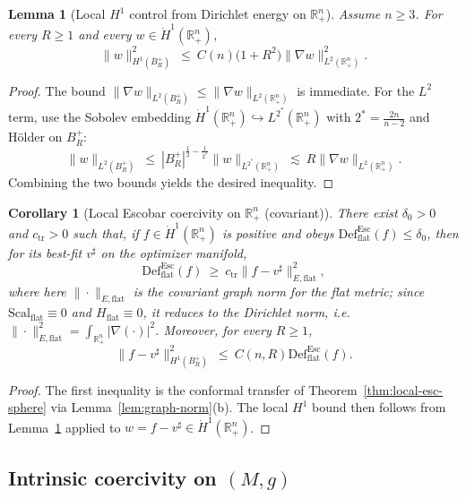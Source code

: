 \documentclass[11pt,reqno,a4paper]{amsart}
\newcommand{\R}{\mathbb{R}}
\numberwithin{equation}{section}
\newcommand{\Def}{\mathrm{Def}}
\theoremstyle{plain}
\newtheorem{lemma}[theorem]{Lemma}
\newtheorem{corollary}[theorem]{Corollary}
\newcommand{\Scal}{\mathrm{Scal}}
\theoremstyle{remark}
\theoremstyle{plain}
\begin{document}
\begin{lemma}[Local $H^1$ control from Dirichlet energy on $\R^n_+$]\label{lem:local-H1-from-Dirichlet}
Assume $n\ge3$. For every $R\ge1$ and every $w\in \dot H^1(\R^n_+)$,
\[
\|w\|_{H^1(B_R^+)}^2 \ \le\ C(n)\big(1+R^2\big)\|\nabla w\|_{L^2(\R^n_+)}^2.
\]
\end{lemma}

\begin{proof} The bound $\|\nabla w\|_{L^2(B_R^+)}\le \|\nabla w\|_{L^2(\R^n_+)}$ is immediate. For the $L^2$ term, use the Sobolev embedding $\dot H^1(\R^n_+)\hookrightarrow L^{2^\ast}(\R^n_+)$ with $2^\ast=\frac{2n}{n-2}$ and H\"{o}lder on $B_R^+$:
\[
\|w\|_{L^2(B_R^+)} \ \le\ |B_R^+|^{\frac1{2}-\frac1{2^\ast}}\|w\|_{L^{2^\ast}(\R^n_+)}
\ \lesssim\ R\|\nabla w\|_{L^2(\R^n_+)}.
\]
Combining the two bounds yields the desired inequality.
\end{proof}

\begin{corollary}[Local Escobar coercivity on $\R^n_+$ (covariant)]
\label{cor:local-esc-halfspace}
There exist $\delta_0>0$ and $c_{\mathrm{tr}}>0$ such that, if $f\in \dot H^1(\R^n_+)$ is \emph{positive} and obeys
$\Def^{\mathrm{Esc}}_{\mathrm{flat}}(f)\le\delta_0$, then for its best-fit $v^\sharp$ on the optimizer manifold,
\[
\Def^{\mathrm{Esc}}_{\mathrm{flat}}(f)\ \ge\ c_{\mathrm{tr}}\|f-v^\sharp\|_{E,\mathrm{flat}}^2,
\]
where here $\|\cdot\|_{E,\mathrm{flat}}$ is the covariant graph norm for the flat metric; since $\Scal_{\mathrm{flat}}\equiv0$ and $H_{\mathrm{flat}}\equiv0$, it reduces to the Dirichlet norm, i.e.
$\|\cdot\|_{E,\mathrm{flat}}^2=\int_{\R^n_+}|\nabla(\cdot)|^2$. Moreover, for every $R\ge1$,
\[
\|f-v^\sharp\|_{H^1(B_R^+)}^2\ \le\ C(n,R)\Def^{\mathrm{Esc}}_{\mathrm{flat}}(f).
\]
\end{corollary}
\begin{proof} The first inequality is the conformal transfer of Theorem~\ref{thm:local-esc-sphere} via Lemma~\ref{lem:graph-norm}(b). The local $H^1$ bound then follows from Lemma~\ref{lem:local-H1-from-Dirichlet} applied to $w=f-v^\sharp\in\dot H^1(\R^n_+)$.
\end{proof}


\subsection{Intrinsic coercivity on \texorpdfstring{$(M,g)$}{(M, g)}}
\end{document}
